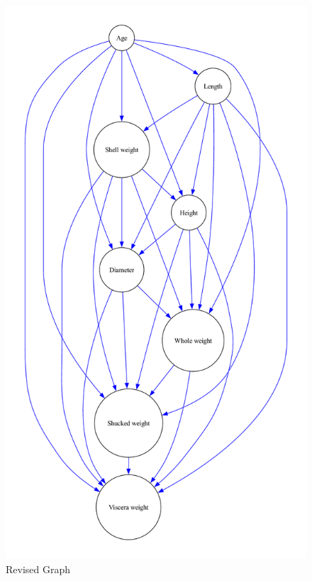 \documentclass{article}
\begin{document}
\hfill
\begin{minipage}[t]{0.4\linewidth}
    \begin{figure}[H]
        \centering
        \vspace{-0.5cm}
        \includegraphics[width=\linewidth]{./demo_data/20241104_121546/Abalone/output_graph/revised_graph.pdf}
        \caption{\label{fig:corr}Revised Graph}
    \end{figure}
\end{minipage}
\end{document}
